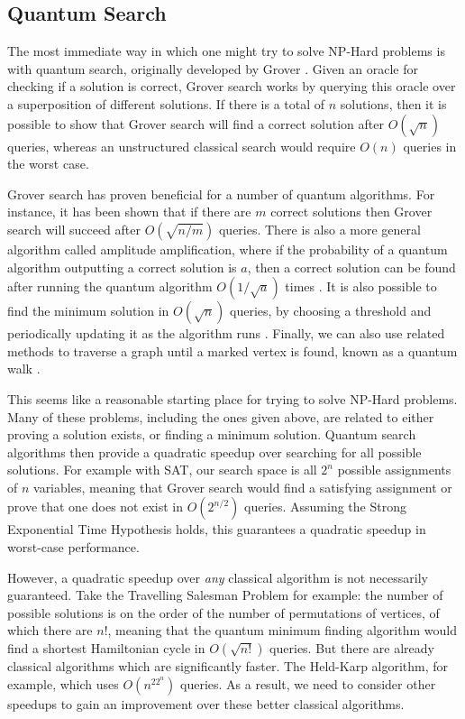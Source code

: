 \subsection{Quantum Search}

The most immediate way in which one might try to solve NP-Hard problems is with quantum search, originally developed by Grover \cite{grover96}. Given an oracle for checking if a solution is correct, Grover search works by querying this oracle over a superposition of different solutions. If there is a total of $n$ solutions, then it is possible to show that Grover search will find a correct solution after $O(\sqrt{n})$ queries, whereas an unstructured classical search would require $O(n)$ queries in the worst case.

Grover search has proven beneficial for a number of quantum algorithms. For instance, it has been shown that if there are $m$ correct solutions then Grover search will succeed after $O(\sqrt{n/m})$ queries. There is also a more general algorithm called amplitude amplification, where if the probability of a quantum algorithm outputting a correct solution is $a$, then a correct solution can be found after running the quantum algorithm $O(1/\sqrt{a})$ times \cite{brassard2002}. It is also possible to find the minimum solution in $O(\sqrt{n})$ queries, by choosing a threshold and periodically updating it as the algorithm runs \cite{durr1996}. Finally, we can also use related methods to traverse a graph until a marked vertex is found, known as a quantum walk \cite{childs2003}.

This seems like a reasonable starting place for trying to solve NP-Hard problems. Many of these problems, including the ones given above, are related to either proving a solution exists, or finding a minimum solution. Quantum search algorithms then provide a quadratic speedup over searching for all possible solutions. For example with SAT, our search space is all $2^n$ possible assignments of $n$ variables, meaning that Grover search would find a satisfying assignment or prove that one does not exist in $O(2^{n/2})$ queries. Assuming the Strong Exponential Time Hypothesis holds, this guarantees a quadratic speedup in worst-case performance.

However, a quadratic speedup over \textit{any} classical algorithm is not necessarily guaranteed. Take the Travelling Salesman Problem for example: the number of possible solutions is on the order of the number of permutations of vertices, of which there are $n!$, meaning that the quantum minimum finding algorithm would find a shortest Hamiltonian cycle in $O(\sqrt{n!})$ queries. But there are already classical algorithms which are significantly faster. The Held-Karp algorithm, for example, which uses $O(n^22^n)$ queries. As a result, we need to consider other speedups to gain an improvement over these better classical algorithms.

